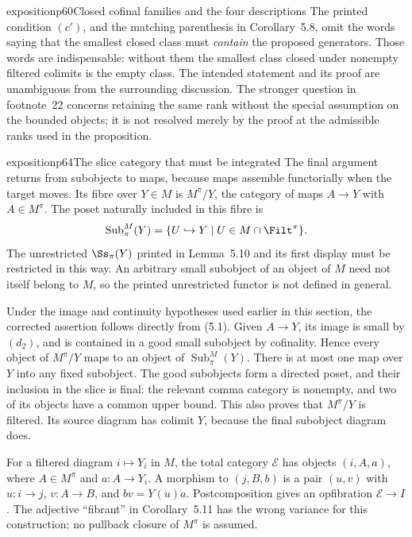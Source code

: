 \begin{dcomment}{exposition}{p60}{Closed cofinal families and the four descriptions}
The printed condition $(c')$, and the matching parenthesis in Corollary~5.8, omit the words saying that the smallest closed class must \emph{contain} the proposed generators. Those words are indispensable: without them the smallest class closed under nonempty filtered colimits is the empty class. The intended statement and its proof are unambiguous from the surrounding discussion. The stronger question in footnote~22 concerns retaining the same rank without the special assumption on the bounded objects; it is not resolved merely by the proof at the admissible ranks used in the proposition.
\end{dcomment}

\begin{dcomment}{exposition}{p64}{The slice category that must be integrated}
The final argument returns from subobjects to maps, because maps assemble functorially when the target moves. Its fibre over $Y\in M$ is $M^\pi/Y$, the category of maps $A\to Y$ with $A\in M^\pi$. The poset naturally included in this fibre is
\[
 \operatorname{Sub}_{\pi}^{M}(Y)
 =\{U\hookrightarrow Y\mid U\in M\cap\Filt^\pi\}.
\]
The unrestricted $\Ss_\pi(Y)$ printed in Lemma~5.10 and its first display must be restricted in this way. An arbitrary small subobject of an object of $M$ need not itself belong to $M$, so the printed unrestricted functor is not defined in general.

Under the image and continuity hypotheses used earlier in this section, the corrected assertion follows directly from (5.1). Given $A\to Y$, its image is small by $(d_2)$, and is contained in a good small subobject by cofinality. Hence every object of $M^\pi/Y$ maps to an object of $\operatorname{Sub}_{\pi}^{M}(Y)$. There is at most one map over $Y$ into any fixed subobject. The good subobjects form a directed poset, and their inclusion in the slice is final: the relevant comma category is nonempty, and two of its objects have a common upper bound. This also proves that $M^\pi/Y$ is filtered. Its source diagram has colimit $Y$, because the final subobject diagram does.

For a filtered diagram $i\mapsto Y_i$ in $M$, the total category $\mathcal E$ has objects $(i,A,a)$, where $A\in M^\pi$ and $a:A\to Y_i$. A morphism to $(j,B,b)$ is a pair $(u,v)$ with $u:i\to j$, $v:A\to B$, and $bv=Y(u)a$. Postcomposition gives an opfibration $\mathcal E\to I$. The adjective ``fibrant'' in Corollary~5.11 has the wrong variance for this construction; no pullback closure of $M^\pi$ is assumed.


\end{dcomment}
